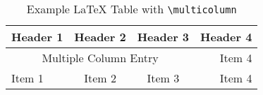 \begin{table}[H]
   \caption{Example LaTeX Table with \texttt{\textbackslash multicolumn}} 
   \label{tab:example_multicolumn}
   \small
   \centering
   \begin{tabular}{lccr}
   \toprule\toprule
   \textbf{Header 1} & \textbf{Header 2} & \textbf{Header 3} & \textbf{Header 4} \\ 
   \midrule
   \multicolumn{3}{c}{Multiple Column Entry} & Item 4 \\
   Item 1 & Item 2 & Item 3 & Item 4\\
   \bottomrule
   \end{tabular}
\end{table}